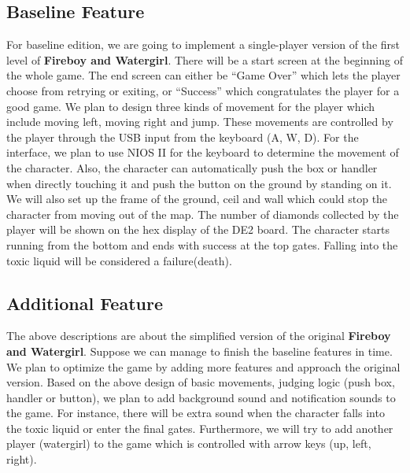 \documentclass[a4paper]{article}
\begin{document}
\subsection{Baseline Feature}
For baseline edition, we are going to implement a single-player version of the first level of \textbf{Fireboy and Watergirl}. There will be a start screen at the beginning of the whole game. 
The end screen can either be “Game Over” which lets the player choose from retrying or exiting, or “Success” which congratulates the player for a good game. 
We plan to design three kinds of movement for the player which include moving left, moving right and jump. These movements are controlled by the player through the USB input from the keyboard (A, W, D). 
For the interface, we plan to use NIOS II for the keyboard to determine the movement of the character. Also, the character can automatically push the box or handler when directly touching it and push the button on the ground by standing on it. 
We will also set up the frame of the ground, ceil and wall which could stop the character from moving out of the map. The number of diamonds collected by the player will be shown on the hex display of the DE2 board. 
The character starts running from the bottom and ends with success at the top gates. Falling into the toxic liquid will be considered a failure(death).

\subsection{Additional Feature}
The above descriptions are about the simplified version of the original \textbf{Fireboy and Watergirl}. Suppose we can manage to finish the baseline features in time. We plan to optimize the game by adding more features and approach the original version. 
Based on the above design of basic movements, judging logic (push box, handler or button), we plan to add background sound and notification sounds to the game. For instance, there will be extra sound when the character falls into the toxic liquid or 
enter the final gates. Furthermore, we will try to add another player (watergirl) to the game which is controlled with arrow keys (up, left, right).
\end{document}
